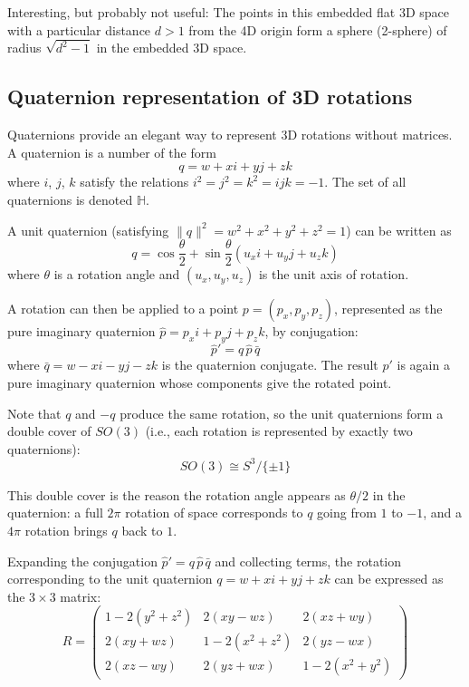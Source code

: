 \documentclass[twocolumn,10pt]{article}
\begin{document}
Interesting, but probably not useful: The points in this embedded flat 3D space with a particular distance $d > 1$ from the 4D origin form a sphere (2-sphere) of radius $\sqrt{d^2 - 1}$ in the embedded 3D space.

\subsection{Quaternion representation of 3D rotations}\label{sec:quaternion-rotation}

Quaternions provide an elegant way to represent 3D rotations without matrices. A quaternion is a number of the form
\[
    q = w + xi + yj + zk
\]
where $i$, $j$, $k$ satisfy the relations $i^2 = j^2 = k^2 = ijk = -1$. The set of all quaternions is denoted $\mathbb{H}$.

A unit quaternion (satisfying $\|q\|^2 = w^2 + x^2 + y^2 + z^2 = 1$) can be written as
\[
    q = \cos\frac{\theta}{2} + \sin\frac{\theta}{2}(u_x i + u_y j + u_z k)
\]
where $\theta$ is a rotation angle and $(u_x, u_y, u_z)$ is the unit axis of rotation.

A rotation can then be applied to a point $p = (p_x, p_y, p_z)$, represented as the pure imaginary quaternion $\hat{p} = p_x i + p_y j + p_z k$, by conjugation:
\[
    \hat{p}' = q \, \hat{p} \, \bar{q}
\]
where $\bar{q} = w - xi - yj - zk$ is the quaternion conjugate. The result $\hat{p}'$ is again a pure imaginary quaternion whose components give the rotated point.

Note that $q$ and $-q$ produce the same rotation, so the unit quaternions form a double cover of $SO(3)$ (i.e., each rotation is represented by exactly two quaternions):
\[
    SO(3) \cong S^3 / \{\pm 1\}
\]

This double cover is the reason the rotation angle appears as $\theta/2$ in the quaternion: a full $2\pi$ rotation of space corresponds to $q$ going from $1$ to $-1$, and a $4\pi$ rotation brings $q$ back to $1$.

Expanding the conjugation $\hat{p}' = q\,\hat{p}\,\bar{q}$ and collecting terms, the rotation corresponding to the unit quaternion $q = w + xi + yj + zk$ can be expressed as the $3 \times 3$ matrix:
\[
    R = \begin{pmatrix}
        1 - 2(y^2 + z^2) & 2(xy - wz)       & 2(xz + wy) \\
        2(xy + wz)       & 1 - 2(x^2 + z^2) & 2(yz - wx) \\
        2(xz - wy)       & 2(yz + wx)        & 1 - 2(x^2 + y^2)
    \end{pmatrix}
\]
\end{document}
